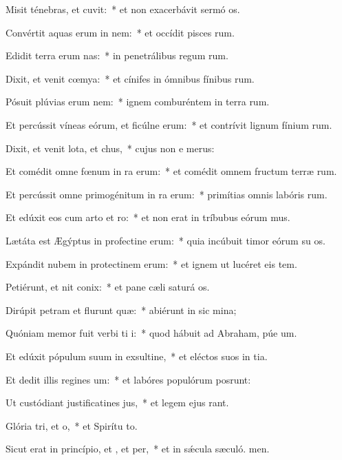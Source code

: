 \item Misit ténebras, et cuvit:~* et non exacerbávit sermó os.
\item Convértit aquas erum in nem:~* et occídit pisces rum.
\item Edidit terra erum nas:~* in penetrálibus regum rum.
\item Dixit, et venit cœmya:~* et cínifes in ómnibus fínibus rum.
\item Pósuit plúvias erum nem:~* ignem comburéntem in terra rum.
\item Et percússit víneas eórum, et ficúlne erum:~* et contrívit lignum fínium rum.
\item Dixit, et venit lota, et chus,~* cujus non e merus:
\item Et comédit omne fœnum in ra erum:~* et comédit omnem fructum terræ rum.
\item Et percússit omne primogénitum in ra erum:~* primítias omnis labóris rum.
\item Et edúxit eos cum arto et ro:~* et non erat in tríbubus eórum mus.
\item Lætáta est Ægýptus in profectine erum:~* quia incúbuit timor eórum su os.
\item Expándit nubem in protectinem erum:~* et ignem ut lucéret eis  tem.
\item Petiérunt, et nit conix:~* et pane cæli saturá os.
\item Dirúpit petram et flurunt quæ:~* abiérunt in sic mina;
\item Quóniam memor fuit verbi ti i:~* quod hábuit ad Abraham, púe um.
\item Et edúxit pópulum suum in exsultine,~* et eléctos suos in tia.
\item Et dedit illis regines um:~* et labóres populórum posrunt:
\item Ut custódiant justificatines jus,~* et legem ejus rant.
\item Glória tri, et o,~* et Spirítu to.
\item Sicut erat in princípio, et , et per,~* et in sǽcula sæculó. men.

